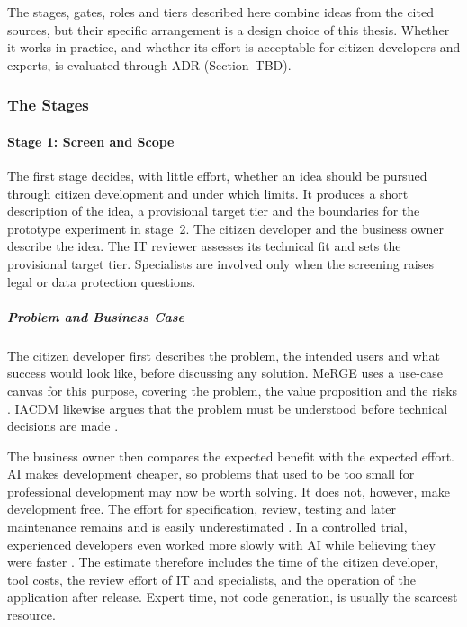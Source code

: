 \documentclass[10pt,a4paper]{article}
\begin{document}
The stages, gates, roles and tiers described here combine ideas from the cited sources, but their specific arrangement is a design choice of this thesis. Whether it works in practice, and whether its effort is acceptable for citizen developers and experts, is evaluated through ADR (Section~TBD).

\subsubsection{The Stages}

\paragraph{Stage 1: Screen and Scope}

The first stage decides, with little effort, whether an idea should be pursued through citizen development and under which limits. It produces a short description of the idea, a provisional target tier and the boundaries for the prototype experiment in stage~2. The citizen developer and the business owner describe the idea. The IT reviewer assesses its technical fit and sets the provisional target tier. Specialists are involved only when the screening raises legal or data protection questions.

\subparagraph{Problem and Business Case}

The citizen developer first describes the problem, the intended users and what success would look like, before discussing any solution. MeRGE uses a use-case canvas for this purpose, covering the problem, the value proposition and the risks \parencite{fetzer2026}. IACDM likewise argues that the problem must be understood before technical decisions are made \parencite{moreira2026}.

The business owner then compares the expected benefit with the expected effort. AI makes development cheaper, so problems that used to be too small for professional development may now be worth solving. It does not, however, make development free. The effort for specification, review, testing and later maintenance remains and is easily underestimated \parencite{wangliu2026}. In a controlled trial, experienced developers even worked more slowly with AI while believing they were faster \parencite{moreira2026}. The estimate therefore includes the time of the citizen developer, tool costs, the review effort of IT and specialists, and the operation of the application after release. Expert time, not code generation, is usually the scarcest resource.
\end{document}
